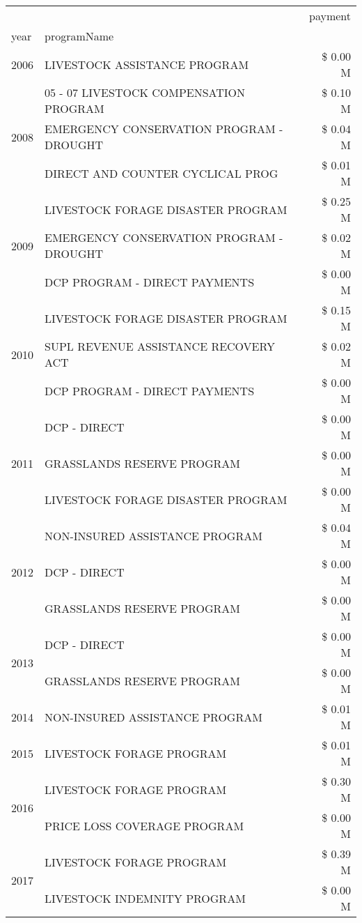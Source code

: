 \begin{tabular}{llr}
\toprule
 &  & payment \\
year & programName &  \\
\midrule
2006 & LIVESTOCK ASSISTANCE PROGRAM & \$ 0.00 M \\
\cline{1-3}
\multirow[t]{3}{*}{2008} & 05 - 07 LIVESTOCK COMPENSATION PROGRAM & \$ 0.10 M \\
 & EMERGENCY CONSERVATION PROGRAM - DROUGHT & \$ 0.04 M \\
 & DIRECT AND COUNTER CYCLICAL PROG & \$ 0.01 M \\
\cline{1-3}
\multirow[t]{3}{*}{2009} & LIVESTOCK FORAGE DISASTER  PROGRAM & \$ 0.25 M \\
 & EMERGENCY CONSERVATION PROGRAM - DROUGHT & \$ 0.02 M \\
 & DCP PROGRAM - DIRECT PAYMENTS & \$ 0.00 M \\
\cline{1-3}
\multirow[t]{3}{*}{2010} & LIVESTOCK FORAGE DISASTER  PROGRAM & \$ 0.15 M \\
 & SUPL REVENUE ASSISTANCE RECOVERY ACT & \$ 0.02 M \\
 & DCP PROGRAM - DIRECT PAYMENTS & \$ 0.00 M \\
\cline{1-3}
\multirow[t]{3}{*}{2011} & DCP - DIRECT & \$ 0.00 M \\
 & GRASSLANDS RESERVE PROGRAM & \$ 0.00 M \\
 & LIVESTOCK FORAGE DISASTER PROGRAM & \$ 0.00 M \\
\cline{1-3}
\multirow[t]{3}{*}{2012} & NON-INSURED ASSISTANCE PROGRAM & \$ 0.04 M \\
 & DCP - DIRECT & \$ 0.00 M \\
 & GRASSLANDS RESERVE PROGRAM & \$ 0.00 M \\
\cline{1-3}
\multirow[t]{2}{*}{2013} & DCP - DIRECT & \$ 0.00 M \\
 & GRASSLANDS RESERVE PROGRAM & \$ 0.00 M \\
\cline{1-3}
2014 & NON-INSURED ASSISTANCE PROGRAM & \$ 0.01 M \\
\cline{1-3}
2015 & LIVESTOCK FORAGE PROGRAM & \$ 0.01 M \\
\cline{1-3}
\multirow[t]{2}{*}{2016} & LIVESTOCK FORAGE PROGRAM                      & \$ 0.30 M \\
 & PRICE LOSS COVERAGE PROGRAM                   & \$ 0.00 M \\
\cline{1-3}
\multirow[t]{2}{*}{2017} & LIVESTOCK FORAGE PROGRAM & \$ 0.39 M \\
 & LIVESTOCK INDEMNITY PROGRAM & \$ 0.00 M \\

\end{tabular}
